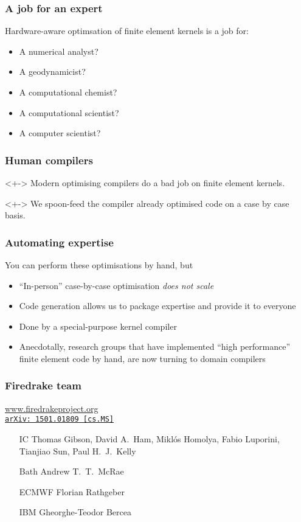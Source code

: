 \documentclass[presentation]{beamer}
\newcommand{\arxivlink}[2]{%
  \href{http://www.arxiv.org/abs/#1}%
  {{\small\texttt{arXiv:\,#1\,[#2]}}}%
}
\begin{document}
\begin{frame}
  \frametitle{A job for an expert}
  Hardware-aware optimsation of finite element kernels is a job for:
  \begin{itemize}
  \item<2-> A numerical analyst?
  \item<3-> A geodynamicist?
  \item<4-> A computational chemist?
  \item<5-> A computational scientist?
  \item<6-> A computer scientist?
  \end{itemize}
\end{frame}

\begin{frame}[fragile]
  \frametitle{Human compilers}
  \begin{problem}<+->
    Modern optimising compilers do a bad job on finite element
    kernels.
  \end{problem}
  \begin{corollary}<+->
    We spoon-feed the compiler already optimised code on a case by
    case basis.
  \end{corollary}
\end{frame}
  
\begin{frame}
  \frametitle{Automating expertise}
  You can perform these optimisations by hand, but
  
  \begin{itemize}
  \item ``In-person'' case-by-case optimisation \emph{does not scale}
  \item Code generation allows us to package expertise and provide it
    to everyone
  \item Done by a special-purpose kernel compiler
  \item Anecdotally, research groups that have implemented ``high
    performance'' finite element code by hand, are now turning to
    domain compilers
  \end{itemize}
\end{frame}

\begin{frame}
  \frametitle{Firedrake team}
  \begin{center}
    \url{www.firedrakeproject.org}\\
    \cite{Rathgeber:2016} \arxivlink{1501.01809}{cs.MS}
  \end{center}

  \begin{itemize}
  \item[IC] Thomas Gibson, David A.~Ham, Mikl\'os Homolya, {\color{gray}Fabio
    Luporini}, Tianjiao Sun, Paul H.~J.~Kelly
  \item[Bath] Andrew T.~T.~McRae
  \item[\color{gray}ECMWF] \color{gray}Florian Rathgeber
  \item[\color{gray}IBM] \color{gray}Gheorghe-Teodor Bercea
  \end{itemize}
\end{frame}
\end{document}

